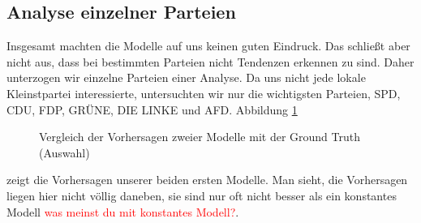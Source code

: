 \documentclass[a4paper,10pt]{scrartcl}
\begin{document}
\subsection{Analyse einzelner Parteien}
Insgesamt machten die Modelle auf uns keinen guten Eindruck. Das schließt aber nicht aus, dass bei bestimmten Parteien nicht Tendenzen erkennen zu sind. Daher unterzogen wir einzelne Parteien einer Analyse. Da uns nicht jede lokale Kleinstpartei interessierte, untersuchten wir nur die wichtigsten Parteien, SPD, CDU, FDP, GRÜNE, DIE LINKE und AFD. Abbildung \ref{fig:simple_parties} \begin{figure}[h]
	\centering
	\caption{Vergleich der Vorhersagen zweier Modelle mit der Ground Truth (Auswahl)}
	\label{fig:simple_parties}
	\end{figure}  
	zeigt die Vorhersagen unserer beiden ersten Modelle. Man sieht, die Vorhersagen liegen hier nicht völlig daneben, sie sind nur oft nicht besser als ein konstantes Modell \textcolor{red}{was meinst du mit konstantes Modell?}.
\end{document}
